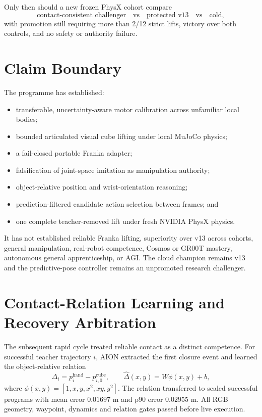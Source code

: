 \documentclass[11pt,a4paper]{article}
\begin{document}
Only then should a new frozen PhysX cohort compare
\begin{equation}
\text{contact-consistent challenger}
\quad\text{vs}\quad
\text{protected v13}
\quad\text{vs}\quad
\text{cold},
\end{equation}
with promotion still requiring more than 2/12 strict lifts, victory over both
controls, and no safety or authority failure.

\section{Claim Boundary}

The programme has established:
\begin{itemize}
\item transferable, uncertainty-aware motor calibration across unfamiliar
local bodies;
\item bounded articulated visual cube lifting under local MuJoCo physics;
\item a fail-closed portable Franka adapter;
\item falsification of joint-space imitation as manipulation authority;
\item object-relative position and wrist-orientation reasoning;
\item prediction-filtered candidate action selection between frames; and
\item one complete teacher-removed lift under fresh NVIDIA PhysX physics.
\end{itemize}

It has not established reliable Franka lifting, superiority over v13 across
cohorts, general manipulation, real-robot competence, Cosmos or GR00T mastery,
autonomous general apprenticeship, or AGI.  The cloud champion remains v13 and
the predictive-pose controller remains an unpromoted research challenger.

\section{Contact-Relation Learning and Recovery Arbitration}

The subsequent rapid cycle treated reliable contact as a distinct competence.
For successful teacher trajectory $i$, AION extracted the first closure event
and learned the object-relative relation
\begin{equation}
  \Delta_i = p^{\mathrm{hand}}_i - p^{\mathrm{cube}}_{i,0},
  \qquad
  \widehat{\Delta}(x,y)=W\phi(x,y)+b,
\end{equation}
where $\phi(x,y)=[1,x,y,x^2,xy,y^2]$.  The relation transferred to sealed
successful programs with mean error $0.01697$ m and p90 error $0.02955$ m.
All RGB geometry, waypoint, dynamics and relation gates passed before live
execution.
\end{document}
